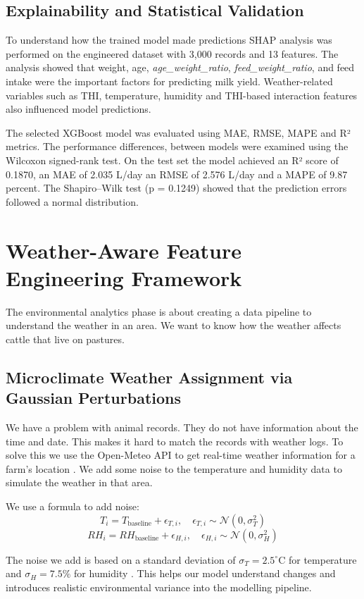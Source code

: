 \documentclass[conference]{IEEEtran}
\begin{document}
	\subsection{Explainability and Statistical Validation}
	To understand how the trained model made predictions SHAP analysis was performed on the engineered dataset with 3,000 records and 13 features. The analysis showed that weight, age, \textit{age\_weight\_ratio}, \textit{feed\_weight\_ratio}, and feed intake were the important factors for predicting milk yield. Weather-related variables such as THI, temperature, humidity and THI-based interaction features also influenced model predictions.
	
	The selected XGBoost model was evaluated using MAE, RMSE, MAPE and R² metrics. The performance differences, between models were examined using the Wilcoxon signed-rank test. On the test set the model achieved an R² score of 0.1870, an MAE of 2.035 L/day an RMSE of 2.576 L/day and a MAPE of 9.87 percent. The Shapiro–Wilk test (p = 0.1249) showed that the prediction errors followed a normal distribution.
	
	\section{Weather-Aware Feature Engineering Framework}
	The environmental analytics phase is about creating a data pipeline to understand the weather in an area. We want to know how the weather affects cattle that live on pastures.
	
	\subsection{Microclimate Weather Assignment via Gaussian Perturbations}
	We have a problem with animal records. They do not have information about the time and date. This makes it hard to match the records with weather logs. To solve this we use the Open-Meteo API to get real-time weather information for a farm's location \cite{ref1}. We add some noise to the temperature and humidity data to simulate the weather in that area.
	
	We use a formula to add noise:
	$$T_i = T_{\text{baseline}} + \epsilon_{T, i}, \quad \epsilon_{T, i} \sim \mathcal{N}(0, \sigma^2_T)$$
	$$RH_i = RH_{\text{baseline}} + \epsilon_{H, i}, \quad \epsilon_{H, i} \sim \mathcal{N}(0, \sigma^2_H)$$
	
	The noise we add is based on a standard deviation of
	$\sigma_T = 2.5^{\circ}\mathrm{C}$ for temperature and
	$\sigma_H = 7.5\%$ for humidity \cite{ref2}.
	This helps our model understand changes and introduces realistic environmental variance into the modelling pipeline.
	
\end{document}
